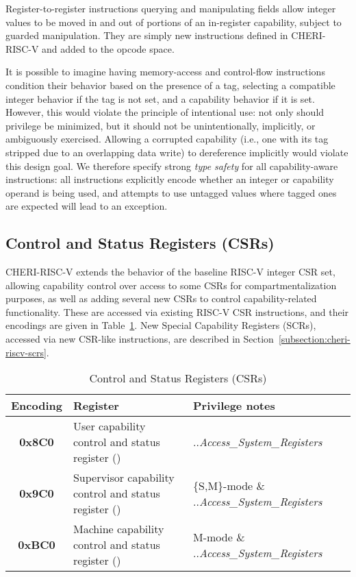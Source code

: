 Register-to-register instructions querying and manipulating fields allow integer values to be moved in and
out of portions of an in-register capability, subject to guarded manipulation.
They are simply new instructions defined in CHERI-RISC-V and added to
the opcode space.

It is possible to imagine having memory-access and
control-flow instructions condition their behavior based on the presence of a
tag, selecting a compatible integer behavior if the tag is not set, and a
capability behavior if it is set.
However, this would violate the principle of intentional use: not only should
privilege be minimized, but it should not be unintentionally, implicitly, or
ambiguously exercised.
Allowing a corrupted capability (i.e., one with its tag stripped due to an
overlapping data write) to dereference \DDC{} implicitly would violate this
design goal.
We therefore specify strong \textit{type safety} for all capability-aware
instructions: all instructions explicitly encode whether an integer or
capability operand is being used, and attempts to use untagged values where
tagged ones are expected will lead to an exception.

\subsection{Control and Status Registers (CSRs)}
\label{subsection:cheri-riscv-csrs}

CHERI-RISC-V extends the behavior of the baseline RISC-V integer CSR set,
allowing capability control over access to some CSRs for compartmentalization
purposes, as well as adding several new CSRs to control capability-related
functionality.
These are accessed via existing RISC-V CSR instructions, and their encodings
are given in Table~\ref{tab:risc-v-control-and-status-registers}.
New Special Capability Registers (SCRs), accessed via new CSR-like
instructions, are described in Section~\ref{subsection:cheri-riscv-scrs}.

\begin{table}[h]
\centering
\begin{tabular}{c>{\raggedright\arraybackslash}p{2.7in}>{\raggedright\arraybackslash}p{2.5in}}
\toprule
\textbf{Encoding} & \textbf{Register} & Privilege notes \\
\midrule
\textbf{0x8C0} & User capability control and status register (\uccsr{}) & \PCC{}.\cperms{}.\emph{Access\_System\_Registers} \\
\textbf{0x9C0} & Supervisor capability control and status register (\sccsr{}) & \{S,M\}-mode \& \PCC{}.\cperms{}.\emph{Access\_System\_Registers} \\
\textbf{0xBC0} & Machine capability control and status register (\mccsr{}) & M-mode \& \PCC{}.\cperms{}.\emph{Access\_System\_Registers} \\
\bottomrule
\end{tabular}
\caption{Control and Status Registers (CSRs)}
\label{tab:risc-v-control-and-status-registers}
\end{table}

